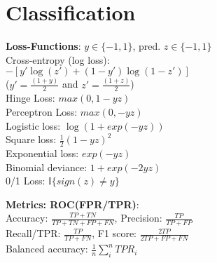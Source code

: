 \section{Classification}
\textbf{Loss-Functions}:
$y \in \{-1,1\}$, pred. $z \in \{-1,1\}$\\
Cross-entropy (log loss):\\
$-[y'\log(z') {+} (1-y')\log(1-z')]$\\ 
($y'=\tfrac{(1+y)}{2}$ and $z'=\tfrac{(1+z)}{2}$) \\
Hinge Loss: $max(0, 1-yz)$ \\
Perceptron Loss: $ max(0, -yz)$ \\
Logistic loss: $\log(1 + exp(-yz))$ \\
Square loss: $\tfrac{1}{2}(1-yz)^2$ \\
Exponential loss: $exp(-yz)$ \\
Binomial deviance: $1 + exp(-2yz)$ \\
0/1 Loss: $\mathbb{I}\{sign(z)\neq y\}$

\textbf{Metrics: ROC(FPR/TPR)}:\\
Accuracy: $\frac{TP+TN}{TP+TN+FP+FN}$, Precision: $\frac{TP}{TP+FP}$\\ Recall/TPR: $\frac{TP}{TP+FN}$, F1 score: $\frac{2TP}{2TP+FP+FN}$\\
Balanced accuracy: $\frac{1}{n}\sum_i^n TPR_i$

